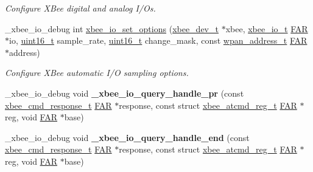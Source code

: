 \begin{DoxyCompactItemize}
\begin{DoxyCompactList}\small\item\em Configure X\+Bee digital and analog I/\+Os. \end{DoxyCompactList}\item 
\+\_\+xbee\+\_\+io\+\_\+debug int \hyperlink{group__xbee__io_ga6a1e9ccca3a6d97f1b583e76f1193dca}{xbee\+\_\+io\+\_\+set\+\_\+options} (\hyperlink{structxbee__dev__t}{xbee\+\_\+dev\+\_\+t} $\ast$xbee, \hyperlink{structxbee__io__t}{xbee\+\_\+io\+\_\+t} \hyperlink{group__hal_gaef060b3456fdcc093a7210a762d5f2ed}{F\+AR} $\ast$io, \hyperlink{group__hal__dos_ga5a8b2dc9e45a9ee81a94ef304fb62505}{uint16\+\_\+t} sample\+\_\+rate, \hyperlink{group__hal__dos_ga5a8b2dc9e45a9ee81a94ef304fb62505}{uint16\+\_\+t} change\+\_\+mask, const \hyperlink{structwpan__address__t}{wpan\+\_\+address\+\_\+t} \hyperlink{group__hal_gaef060b3456fdcc093a7210a762d5f2ed}{F\+AR} $\ast$address)
\begin{DoxyCompactList}\small\item\em Configure X\+Bee automatic I/O sampling options. \end{DoxyCompactList}\item 
\mbox{\label{group__xbee__io_gaa65c33f5a2ca49785dafc0b2408e0d2c}} 
\+\_\+xbee\+\_\+io\+\_\+debug void {\bfseries \+\_\+xbee\+\_\+io\+\_\+query\+\_\+handle\+\_\+pr} (const \hyperlink{structxbee__cmd__response__t}{xbee\+\_\+cmd\+\_\+response\+\_\+t} \hyperlink{group__hal_gaef060b3456fdcc093a7210a762d5f2ed}{F\+AR} $\ast$response, const struct \hyperlink{structxbee__atcmd__reg__t}{xbee\+\_\+atcmd\+\_\+reg\+\_\+t} \hyperlink{group__hal_gaef060b3456fdcc093a7210a762d5f2ed}{F\+AR} $\ast$reg, void \hyperlink{group__hal_gaef060b3456fdcc093a7210a762d5f2ed}{F\+AR} $\ast$base)
\item 
\mbox{\label{group__xbee__io_gab1a374b17b64343fec98a0c2fc419df4}} 
\+\_\+xbee\+\_\+io\+\_\+debug void {\bfseries \+\_\+xbee\+\_\+io\+\_\+query\+\_\+handle\+\_\+end} (const \hyperlink{structxbee__cmd__response__t}{xbee\+\_\+cmd\+\_\+response\+\_\+t} \hyperlink{group__hal_gaef060b3456fdcc093a7210a762d5f2ed}{F\+AR} $\ast$response, const struct \hyperlink{structxbee__atcmd__reg__t}{xbee\+\_\+atcmd\+\_\+reg\+\_\+t} \hyperlink{group__hal_gaef060b3456fdcc093a7210a762d5f2ed}{F\+AR} $\ast$reg, void \hyperlink{group__hal_gaef060b3456fdcc093a7210a762d5f2ed}{F\+AR} $\ast$base)
\item 
\mbox{\label{group__xbee__io_ga730672b8c2d615d0cd3a4083e673e6e8}} 

\end{DoxyCompactItemize}
